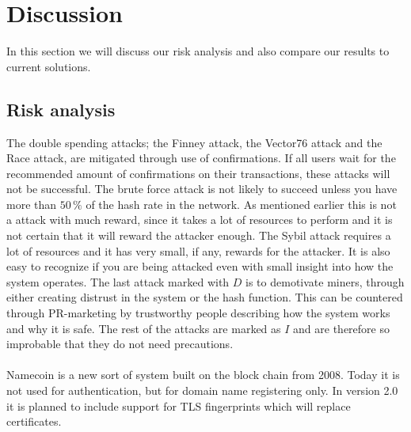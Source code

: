 \documentclass[frame, english]{idamasterthesis}
\begin{document}
\section{Discussion}
In this section we will discuss our risk analysis and also compare our results to current solutions.

\subsection{Risk analysis}
The double spending attacks; the Finney attack, the Vector76 attack and the Race attack, are mitigated through use of confirmations. If all users wait for the recommended amount of confirmations on their transactions, these attacks will not be successful. The brute force attack is not likely to succeed unless you have more than $50 \, \%$ of the hash rate in the network. As mentioned earlier this is not a attack with much reward, since it takes a lot of resources to perform and it is not certain that it will reward the attacker enough. The Sybil attack requires a lot of resources and it has very small, if any, rewards for the attacker. It is also easy to recognize if you are being attacked even with small insight into how the system operates. The last attack marked with $D$ is to demotivate miners, through either creating distrust in the system or the hash function. This can be countered through PR-marketing by trustworthy people describing how the system works and why it is safe. The rest of the attacks are marked as $I$ and are therefore so improbable that they do not need precautions.\\\\
Namecoin is a new sort of system built on the block chain from 2008. Today it is not used for authentication, but for domain name registering only. In version 2.0 it is planned to include support for TLS fingerprints which will replace certificates. 

\pagebreak
\end{document}
